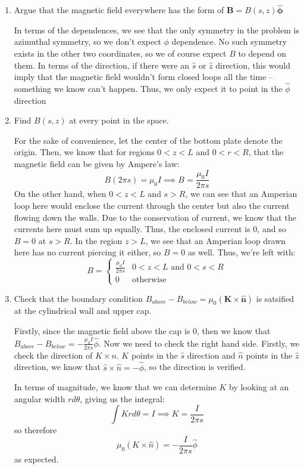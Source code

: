 \documentclass[10pt]{article}
\begin{document}
	\begin{enumerate}[label=\alph*)]
		\item Argue that the magnetic field everywhere has the form of $\mathbf B = B(s, z) \mathbf{\hat{\phi}}$

			\begin{solution}
				In terms of the dependences, we see that the only symmetry in the problem is azimuthal symmetry,
				so we don't expect $\phi$ dependence. No such symmetry exists in the other two coordinates, so 
				we of course expect $B$ to depend on them. In terms of the direction, if there were an $\hat{s}$
				or $\hat{z}$ direction, this would imply that the magnetic field wouldn't form closed loops 
				all the time -- something we know can't happen. Thus, we only expect it to point in the $\hat{
				\phi}$ direction
			\end{solution}
		\item Find $B(s, z)$ at every point in the space. 

			\begin{solution}
				For the sake of convenience, let the center of the bottom plate denote the origin. Then, we know
				that for regions $0 < z < L$ and $0 < r < R$, that the magnetic field can be given by 
				Ampere's law:
				\[
				B(2\pi s) = \mu_0I \implies B = \frac{\mu_0 I}{2\pi s}
				\] 
				On the other hand, when $0 < z < L$ and $s > R$, we can see that an Amperian loop here would 
				enclose the current through the center but also the current flowing down the walls. Due to
				the conservation of current, we know that the currents here must sum up equally. Thus, the 
				enclosed current is 0, and so $B = 0$ at $s > R$. In the region $z > L$, we see
				that an Amperian loop drawn here has no current piercing it either, so $B = 0$ as well. Thus,
				we're left with: 
				\[
				B = \begin{cases}
					\frac{\mu_0 I}{2\pi s} & 0 < z < L \text{ and } 0 < s < R\\
					0 & \text{otherwise}
				\end{cases}
				\] 
			\end{solution}
		\item Check that the boundary condition $B_{above} - B_{below} = \mu_0(\mathbf K \times \hat{\mathbf n})$
			is satsified at the cylindrical wall and upper cap. 

			\begin{solution}
				Firstly, since the magnetic field above the cap is 0, then we know that $B_{above} - B_{below} =
				-\frac{\mu_0I}{2\pi s} \hat{\phi}$. Now we need to check the right hand side. Firstly, we check 
				the direction of $K \times n$. $K$ points in the $\hat{s}$ direction and $\hat{n}$ points in 
				the $\hat{ z}$ direction, we know that $\hat{s} \times \hat{n} = -\hat{\phi}$, so the direction
				is verified. 

				In terms of magnitude, we know that we can determine $K$ by looking at an angular width $ r
				d\theta$, giving us the integral: 
				\[
				\int K r d\theta = I \implies K = \frac{I}{2\pi s}
				\] 
				so therefore
				\[
				\mu_0(K \times \hat{n}) = -\frac{I}{2\pi s}\hat{ \phi}
				\] 
				as expected. 
			\end{solution}
	\end{enumerate}
\end{document}
